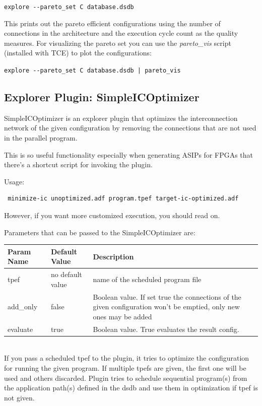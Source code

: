 \documentclass[twoside]{tceusermanual}
\begin{document}
\verb|explore --pareto_set C database.dsdb|

This prints out the pareto efficient configurations using the
number of connections in the architecture and the execution cycle count as
the quality measures. For visualizing the pareto set you can use the
\textit{pareto\_vis} script (installed with TCE) to plot the configurations:

\verb#explore --pareto_set C database.dsdb | pareto_vis#

\subsection{Explorer Plugin: SimpleICOptimizer}

SimpleICOptimizer is an explorer plugin that optimizes the interconnection
network of the given configuration by removing the connections that are not
used in the parallel program. 

This is so useful functionality especially when generating ASIPs for
FPGAs that there's a shortcut script for invoking the plugin.

Usage: 
\begin{verbatim}
 minimize-ic unoptimized.adf program.tpef target-ic-optimized.adf
\end{verbatim}

However, if you want more customized execution, you should read on.

Parameters that can be passed to the
SimpleICOptimizer are:

\begin{tabular}{p{}p{}
                p{}}
\textbf{Param Name} &\textbf{Default Value} &\textbf{Description} \\
\hline
tpef & no default value &  name of the scheduled program file \\
add\_only & false &  Boolean value. If set true the connections of the given 
configuration won't be emptied, only new ones may be added\\
evaluate & true &  Boolean value. True evaluates the result config. \\
\end{tabular}\\

If you pass a scheduled tpef to the plugin, it tries to optimize the configuration
for running the given program. If multiple tpefs are given, the first one will be used
and others discarded.
Plugin tries to schedule sequential program(s) from the application path(s) defined in
the dsdb and use them in optimization if tpef is not given.
\end{document}
